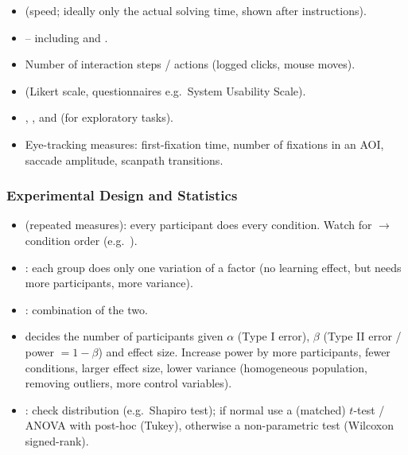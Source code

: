 \begin{exambox}
\begin{itemize}
  \item {} (speed; ideally only the actual solving
        time, shown after instructions).
  \item {} -- including  and
        .
  \item Number of interaction steps / actions (logged clicks, mouse moves).
  \item {} (Likert scale,
        questionnaires e.g.\ System Usability Scale).
  \item {}, , and 
        (for exploratory tasks).
  \item Eye-tracking measures: first-fixation time, number of fixations in an
        AOI, saccade amplitude, scanpath transitions.
\end{itemize}
\end{exambox}

\subsubsection{Experimental Design and Statistics}
\begin{itemize}
  \item {} (repeated measures): every participant does every
        condition. Watch for  $\rightarrow$
         condition order (e.g.\ ).
  \item {}: each group does only one variation of a factor
        (no learning effect, but needs more participants, more variance).
  \item {}: combination of the two.
  \item {} decides the number of participants given
        $\alpha$ (Type I error), $\beta$ (Type II error / power $=1-\beta$) and
        effect size. Increase power by more participants, fewer conditions,
        larger effect size, lower variance (homogeneous population, removing
        outliers, more control variables).
  \item {}: check distribution (e.g.\ Shapiro test);
        if normal use a (matched) $t$-test / ANOVA with post-hoc (Tukey),
        otherwise a non-parametric test (Wilcoxon signed-rank).
\end{itemize}


